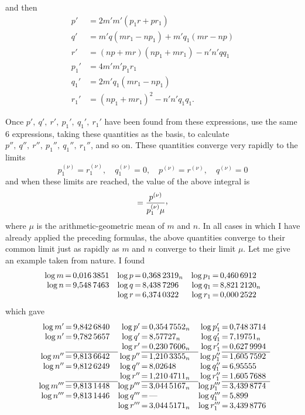 and then
\[
\begin{aligned}
p'&=2m'm'(p_1r+pr_1)\\
q'&=m'q(mr_1-np_1)+m'q_1(mr-np)\\
r'&=(np+mr)(np_1+mr_1)-n'n'qq_1\\
p_1'&=4m'm'p_1r_1\\
q_1'&=2m'q_1(mr_1-np_1)\\
r_1'&=(np_1+mr_1)^2-n'n'q_1q_1.
\end{aligned}
\]
\par Once \(p',\ q',\ r',\ p_1',\ q_1',\ r_1'\) have been found from these expressions, use the same 6 expressions, taking these quantities as the basis, to calculate \(p'',\ q'',\ r'',\ p_1'',\ q_1'',\ r_1''\), and so on. These quantities converge very rapidly to the limits
\[
p_1^{(\nu)}=r_1^{(\nu)},\quad q_1^{(\nu)}=0,\quad p^{(\nu)}=r^{(\nu)},\quad q^{(\nu)}=0
\]
and when these limits are reached, the value of the above integral is
\[
=\frac{p^{(\nu)}}{p_1^{(\nu)}\mu}\mathpunct{\raisebox{.45ex}{,}}
\]
where \(\mu\) is the arithmetic-geometric mean of \(m\) and \(n\). In all cases in which I have already applied the preceding formulas, the above quantities converge to their common limit just as rapidly as \(m\) and \(n\) converge to their limit \(\mu\). Let me give an example taken from nature. I found
\[
\begin{array}{r@{\,}c@{\,}l@{\quad}r@{\,}c@{\,}l@{\quad}r@{\,}c@{\,}l}
\log m&=&0{,}016\,3851&\log p&=&0{,}368\,2319_n&\log p_1&=&0{,}460\,6912\\
\log n&=&9{,}548\,7463&\log q&=&8{,}438\,7296&\log q_1&=&8{,}821\,2120_n\\
&&&\log r&=&6{,}374\,0322&\log r_1&=&0{,}000\,2522
\end{array}
\]
which gave
\[
\begin{array}{r@{\,}c@{\,}l@{\quad}r@{\,}c@{\,}l@{\quad}r@{\,}c@{\,}l}
\log m'&=&9{,}842\,6840&\log p'&=&0{,}354\,7552_n&\log p_1'&=&0{,}748\,3714\\
\log n'&=&9{,}782\,5657&\log q'&=&8{,}57727_n&\log q_1'&=&7{,}19751_n\\
&&&\log r'&=&0{,}230\,7606_n&\log r_1'&=&0{,}627\,9994\\\cline{2-3}\cline{5-6}\cline{8-9}
\log m''&=&9{,}813\,6642&\log p''&=&1{,}210\,3355_n&\log p_1''&=&1{,}605\,7592\\
\log n''&=&9{,}812\,6249&\log q''&=&8{,}02648&\log q_1''&=&6{,}95555\\
&&&\log r''&=&1{,}210\,4711_n&\log r_1''&=&1{,}605\,7688\\\cline{2-3}\cline{5-6}\cline{8-9}
\log m'''&=&9{,}813\,1448&\log p'''&=&3{,}044\,5167_n&\log p_1'''&=&3{,}439\,8774\\
\log n'''&=&9{,}813\,1446&\log q'''&=&\text{—}&\log q_1'''&=&5{,}899\\
&&&\log r'''&=&3{,}044\,5171_n&\log r_1'''&=&3{,}439\,8776
\end{array}
\]
